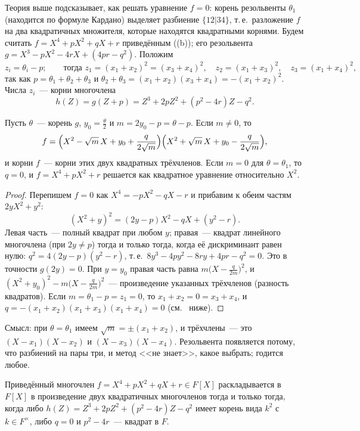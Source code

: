 Теория выше подсказывает, как решать уравнение $f=0$: корень резольвенты $\theta_1$ (находится по формуле Кардано)
выделяет разбиение $\{12|34\}$, т.\,е.\ разложение $f$ на два квадратичных множителя, которые находятся квадратными
корнями. Будем считать $f=X^4+pX^2+qX+r$ приведённым ((b)); его резольвента $g=X^3-pX^2-4rX+(4pr-q^2)$. Положим
\[
z_i=\theta_i-p ;\qquad\text{тогда }z_1=(x_1+x_2)^2=(x_3+x_4)^2,\quad z_2=(x_1+x_3)^2,\quad z_3=(x_1+x_4)^2,
\]
так как $p=\theta_1+\theta_2+\theta_3$ и $\theta_2+\theta_3=(x_1+x_2)(x_3+x_4)=-(x_1+x_2)^2$. Числа $z_i$~--- корни многочлена
\[
h(Z)=g(Z+p)=Z^3+2pZ^2+(p^2-4r)Z-q^2 .
\]

\begin{proposition}
Пусть $\theta$~--- корень $g$, $y_0=\frac\theta2$ и $m=2y_0-p=\theta-p$. Если $m\ne0$, то
\[
f=\Bigl(X^2-\sqrt m\,X+y_0+\frac q{2\sqrt m}\Bigr)\Bigl(X^2+\sqrt m\,X+y_0-\frac q{2\sqrt m}\Bigr),
\]
и корни $f$~--- корни этих двух квадратных трёхчленов. Если $m=0$ для $\theta=\theta_1$, то $q=0$, и $f=X^4+pX^2+r$ решается как
квадратное уравнение относительно $X^2$.
\end{proposition}

\begin{proof}
Перепишем $f=0$ как $X^4=-pX^2-qX-r$ и прибавим к обеим частям $2yX^2+y^2$:
\[
(X^2+y)^2=(2y-p)X^2-qX+(y^2-r).
\]
Левая часть~--- полный квадрат при любом $y$; правая~--- квадрат линейного многочлена (при $2y\ne p$) тогда и только тогда,
когда её дискриминант равен нулю: $q^2=4(2y-p)(y^2-r)$, т.\,е.\ $8y^3-4py^2-8ry+4pr-q^2=0$. Это в точности $g(2y)=0$. При
$y=y_0$ правая часть равна $m\bigl(X-\frac q{2m}\bigr)^2$, и $(X^2+y_0)^2-m\bigl(X-\frac q{2m}\bigr)^2$~--- произведение указанных
трёхчленов (разность квадратов). Если $m=\theta_1-p=z_1=0$, то $x_1+x_2=0=x_3+x_4$, и $q=-(x_1+x_2)(x_1+x_3)(x_1+x_4)=0$ (см.\
 ниже).
\end{proof}

Смысл: при $\theta=\theta_1$ имеем $\sqrt m=\pm(x_1+x_2)$, и трёхчлены~--- это $(X-x_1)(X-x_2)$ и $(X-x_3)(X-x_4)$. Резольвента
появляется потому, что разбиений на пары три, и метод <<не знает>>, какое выбрать; годится любое.

\begin{proposition}
Приведённый многочлен $f=X^4+pX^2+qX+r\in F[X]$ раскладывается в $F[X]$ в произведение двух квадратичных многочленов
тогда и только тогда, когда либо $h(Z)=Z^3+2pZ^2+(p^2-4r)Z-q^2$ имеет корень вида $k^2$ с $k\in F^\times$, либо $q=0$ и
$p^2-4r$~--- квадрат в $F$.
\end{proposition}

